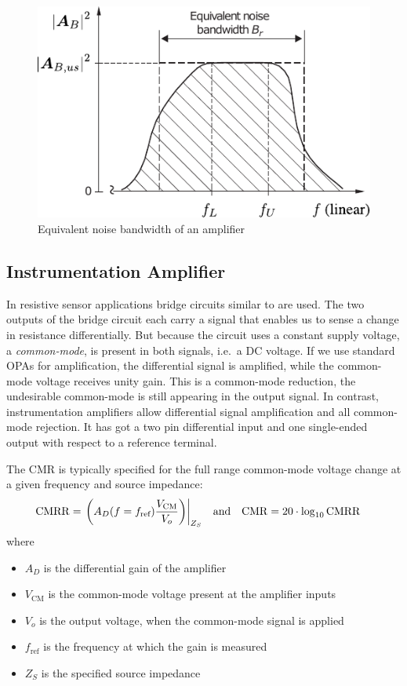 \begin{figure}[htb!]
  \centering
  \includegraphics[scale=1]{figures/electronics/op_amp/equivalent_noise_bandwidth}
  \caption[Equivalent Noise Bandwidth of an Amplifier]{Equivalent noise bandwidth of an amplifier \cite{Tietze2008EC}%
    \label{fig:equivalent_noise_bandwidth}}
\end{figure}

\newpage
\subsection{Instrumentation Amplifier}
In resistive sensor applications bridge circuits similar to  are used. The two outputs of the bridge circuit each carry a signal that enables us to sense a change in resistance differentially. But because the circuit uses a constant supply voltage, a \emph{common-mode}, is present in both signals, i.e.\ a \ac{DC} voltage. If we use standard \ac{OPA}s for amplification, the differential signal is amplified, while the common-mode voltage receives unity gain. This is a common-mode reduction, the undesirable common-mode is still appearing in the output signal. In contrast, instrumentation amplifiers allow differential signal amplification and all common-mode rejection. It has got a two pin differential input and one single-ended output with respect to a reference terminal.

The \ac{CMR} is typically specified for the full range common-mode voltage change at a given frequency and source impedance:
\begin{align}
\mathrm{CMRR} &= \eval{\pqty{A_D(f=f_{\text{ref}})\frac{V_{\mathrm{CM}}}{V_{o}}}}_{Z_S} &\text{and}& &\mathrm{CMR} &= 20\cdot\log_{10}\mathrm{CMRR}
\end{align}
where
\begin{itemize}
  \item $A_D$ is the differential gain of the amplifier
  \item $V_{\mathrm{CM}}$ is the common-mode voltage present at the amplifier inputs
  \item $V_o$ is the output voltage, when the common-mode signal is applied
  \item $f_{\text{ref}}$ is the frequency at which the gain is measured
  \item $Z_S$ is the specified source impedance
\end{itemize}


